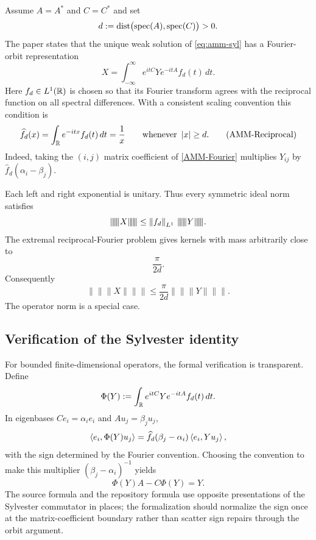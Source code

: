Assume $A=A^*$ and $C=C^*$ and set
\[
  d:=\operatorname{dist}\bigl(\operatorname{spec}(A),\operatorname{spec}(C)\bigr)>0.
\]
The paper states that the unique weak solution of \eqref{eq:amm-syl} has a Fourier-orbit representation
\begin{equation}
  X=\int_{-\infty}^{\infty}
      e^{itC}Ye^{-itA}f_d(t)\,dt.
  \tag{AMM-Fourier}
\end{equation}
Here $f_d\in L^1(\mathbb{R})$ is chosen so that its Fourier transform agrees with the reciprocal function on all spectral differences. With a consistent scaling convention this condition is
\begin{equation}
  \widehat f_d(x)=\int_{\mathbb{R}}e^{-itx}f_d(t)\,dt=\frac1x
  \qquad\text{whenever }\left\lvert x\right\rvert\ge d.
  \tag{AMM-Reciprocal}
\end{equation}
Indeed, taking the $(i,j)$ matrix coefficient of \eqref{AMM-Fourier} multiplies $Y_{ij}$ by $\widehat f_d(\alpha_i-\beta_j)$.

Each left and right exponential is unitary. Thus every symmetric ideal norm satisfies
\[
  \lVert\!\lVert\!\lVert X\rVert\!\rVert\!\rVert
  \le \norm{f_d}_{L^1}\,
      \lVert\!\lVert\!\lVert Y\rVert\!\rVert\!\rVert.
\]
The extremal reciprocal-Fourier problem gives kernels with mass arbitrarily close to
\[
  \frac{\pi}{2d}.
\]
Consequently
\begin{equation}
  \lVert\!\lVert\!\lVert X\rVert\!\rVert\!\rVert
  \le \frac{\pi}{2d}
      \lVert\!\lVert\!\lVert Y\rVert\!\rVert\!\rVert.
  \tag{AMM-Sharp}
\end{equation}
The operator norm is a special case.

\subsection{Verification of the Sylvester identity}

For bounded finite-dimensional operators, the formal verification is transparent. Define
\[
  \Phi(Y):=\int_{\mathbb{R}}e^{itC}Ye^{-itA}f_d(t)\,dt.
\]
In eigenbases $Ce_i=\alpha_i e_i$ and $Au_j=\beta_j u_j$,
\[
  \left\langle e_i,\Phi(Y)u_j\right\rangle
  =\widehat f_d(\beta_j-\alpha_i)\left\langle e_i,Yu_j\right\rangle,
\]
with the sign determined by the Fourier convention. Choosing the convention to make this multiplier $(\beta_j-\alpha_i)^{-1}$ yields
\[
  \Phi(Y)A-C\Phi(Y)=Y.
\]
The source formula and the repository formula use opposite presentations of the Sylvester commutator in places; the formalization should normalize the sign once at the matrix-coefficient boundary rather than scatter sign repairs through the orbit argument.

